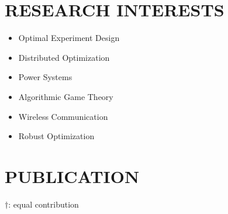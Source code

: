 \documentclass[paper=a4,fontsize=11pt]{scrartcl} %
\newcommand{\NewPart}[1]{\section*{\uppercase{#1}}}
\newcommand{\EducationEntry}[4]{
		\noindent \textbf{#1} \hfill      %
		\colorbox{White}{%
			\parbox{5cm}{%
			\hfill\color{Black}#2}} \par  %
		\noindent \textit{#3} \par        %
		\noindent\hangindent=2em\hangafter=0 \small #4 %
		\normalsize \par}
\begin{document}
\NewPart{RESEARCH INTERESTS}{}
\begin{itemize}
	\item{Optimal Experiment Design}
	
	\item{Distributed Optimization}
	
	\item{Power Systems}
	\item{Algorithmic Game Theory}
	\item{Wireless Communication}
		\item{Robust Optimization}
\end{itemize}


\NewPart{PUBLICATION}{}
$\dag$:  equal contribution
\end{document}
